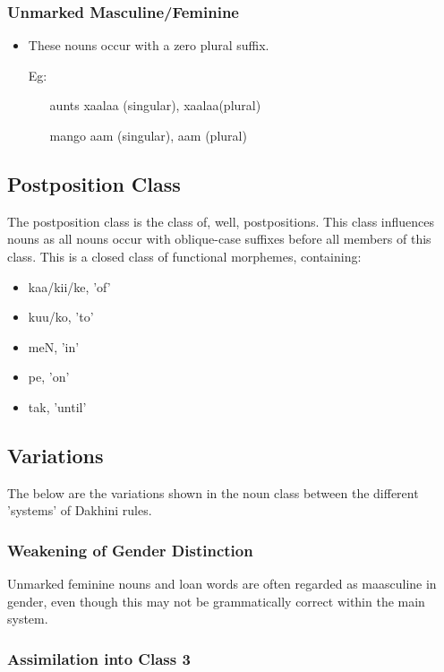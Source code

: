 \documentclass[a4paper]{article}
\begin{document}
\subsubsection{Unmarked Masculine/Feminine}

\begin{itemize}
\item
These nouns occur with a zero plural suffix.
\item[Eg:  ]
	\begin{itemize}
	\item[aunts]
	xaalaa (singular), xaalaa(plural)
	\item[mango]
	aam (singular), aam (plural)
	\end{itemize}
\end{itemize}

\subsection{Postposition Class}

The postposition class is the class of, well, postpositions. This class influences nouns as all nouns occur with oblique-case suffixes before all members of this class. This is a closed class of functional morphemes, containing:

\begin{itemize}
\item
kaa/kii/ke, 'of'
\item
kuu/ko, 'to'
\item
meN, 'in'
\item
pe, 'on'
\item
tak, 'until'
\end{itemize}

\subsection{Variations}

 The below are the variations shown in the noun class between the different 'systems' of Dakhini rules.
 
\subsubsection{Weakening of Gender Distinction}

Unmarked feminine nouns and loan words are often regarded as maasculine in gender, even though this may not be grammatically correct within the main system.

\subsubsection{Assimilation into Class 3}
\end{document}
